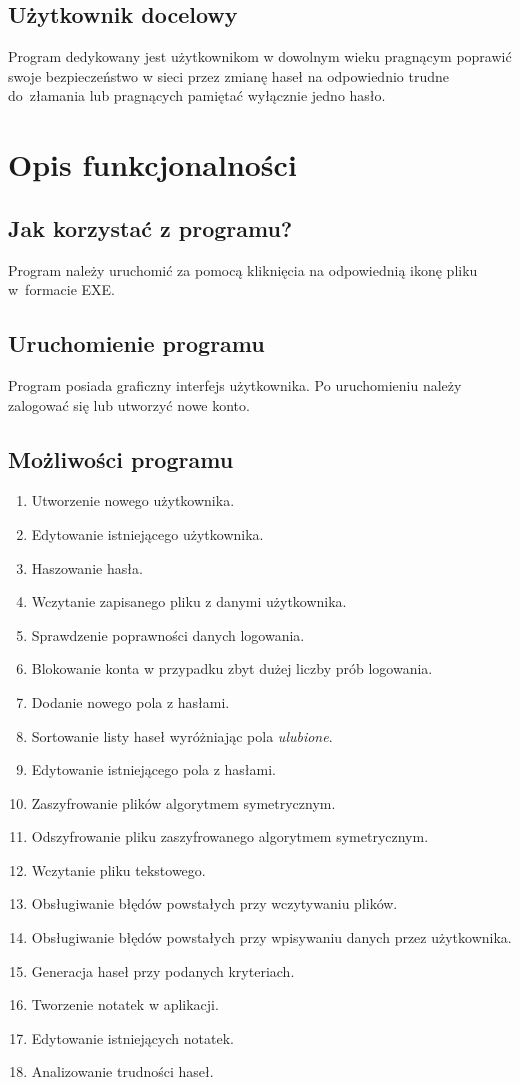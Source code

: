\documentclass[a4paper]{article}
\begin{document}
\subsection{Użytkownik docelowy}
Program dedykowany jest użytkownikom w dowolnym wieku pragnącym poprawić swoje bezpieczeństwo w sieci przez zmianę haseł na odpowiednio trudne do~złamania lub pragnących pamiętać wyłącznie jedno hasło.

\section{Opis funkcjonalności}
\subsection{Jak korzystać z programu?}
Program należy uruchomić za pomocą kliknięcia na odpowiednią ikonę pliku w~formacie EXE.

\subsection{Uruchomienie programu}
Program posiada graficzny interfejs użytkownika. Po uruchomieniu należy zalogować się lub utworzyć nowe konto.

\subsection{Możliwości programu}
\begin{enumerate}
    \item Utworzenie nowego użytkownika.
    \item Edytowanie istniejącego użytkownika.
    \item Haszowanie hasła.
    \item Wczytanie zapisanego pliku z danymi użytkownika.
    \item Sprawdzenie poprawności danych logowania.
    \item Blokowanie konta w przypadku zbyt dużej liczby prób logowania.
    \item Dodanie nowego pola z hasłami.
    \item Sortowanie listy haseł wyróżniając pola \textit{ulubione}.
    \item Edytowanie istniejącego pola z hasłami.
    \item Zaszyfrowanie plików algorytmem symetrycznym.
    \item Odszyfrowanie pliku zaszyfrowanego algorytmem symetrycznym.
    \item Wczytanie pliku tekstowego.
    \item Obsługiwanie błędów powstałych przy wczytywaniu plików.
    \item Obsługiwanie błędów powstałych przy wpisywaniu danych przez użytkownika.
    \item Generacja haseł przy podanych kryteriach.
    \item Tworzenie notatek w aplikacji.
    \item Edytowanie istniejących notatek.
    \item Analizowanie trudności haseł.
\end{enumerate}
\end{document}

